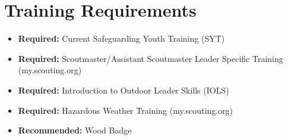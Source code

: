 \documentclass[11pt, letterpaper]{article}
\begin{document}
\begin{minipage}[t]{0.48\linewidth}
\section{Training Requirements}
\begin{itemize}
  \item \textbf{Required:} Current Safeguarding Youth Training (SYT)
  \item \textbf{Required:} Scoutmaster/Assistant Scoutmaster Leader Specific Training (my.scouting.org)
  \item \textbf{Required:} Introduction to Outdoor Leader Skills (IOLS)
  \item \textbf{Required:} Hazardous Weather Training (my.scouting.org)
  \item \textbf{Recommended:} Wood Badge
\end{itemize}

\end{minipage}
\hfill
\end{document}
